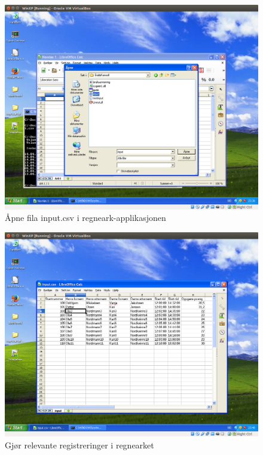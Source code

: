 \documentclass[12pt]{book}
\begin{document}
\begin{figure}[h]
\includegraphics[width=15cm]{012}
\caption{Åpne fila input.csv i regneark-applikasjonen}
\end{figure}

\begin{figure}[h]
\includegraphics[width=15cm]{013}
\caption{Gjør relevante registreringer i regnearket}
\end{figure}
\end{document}
